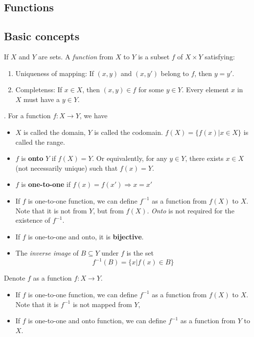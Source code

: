 \begin{refsection}
\section{Functions}
\subsection{Basic concepts}
\begin{definition}[function]
\cite{johnsonbaugh2010foundations}If $X$ and $Y$ are sets. A \emph{function} from $X$ to $Y$ is a subset $f$ of $X \times Y$ satisfying:
\begin{enumerate}
    \item Uniqueness of mapping: If $(x,y)$ and $(x,y')$ belong to $f$, then $y=y'$.
    \item Completenss: If $x\in X$, then $(x,y)\in f$ for some $y \in Y$. Every element $x$ in $X$ must have a $y \in Y$. 
\end{enumerate}
\end{definition}


\begin{definition}
\cite{johnsonbaugh2010foundations}.
For a function $f:X\to Y$, we have
\begin{itemize}
    \item $X$ is called the domain, $Y$ is called the codomain. $f(X)=\{f(x)|x\in X\}$ is called the range. 
    \item $f$ is \textbf{onto} $Y$ if $f(X) = Y$. Or equivalently, for any $y\in Y$, there exists $x \in X$(not necessarily unique) such that $f(x) = Y$.
    \item $f$ is \textbf{one-to-one} if $f(x) = f(x') \Rightarrow x = x'$
    \item If $f$ is one-to-one function, we can define $f^{-1}$ as a function from $f(X)$ to $X$. Note that it is not from $Y$, but from $f(X)$.  \emph{Onto} is not required for the existence of $f^{-1}$.
    \item If $f$ is one-to-one and onto, it is \textbf{bijective}.
    \item The \emph{inverse image} of $B \subseteq Y$ under $f$ is the set
    $$f^{-1}(B)=\{x|f(x)\in B\}$$
\end{itemize}
\end{definition}

\begin{definition}
Denote $f$ as a function $f:X\to Y$. 
\begin{itemize}
	\item If $f$ is one-to-one function, we can define $f^{-1}$ as a function from $f(X)$ to $X$. Note that it is $f^{-1}$ is not mapped from $Y$,
	\item If $f$ is one-to-one and onto function, we can define $f^{-1}$ as a function from $Y$ to $X$.
\end{itemize}
\end{definition}



\end{refsection}
